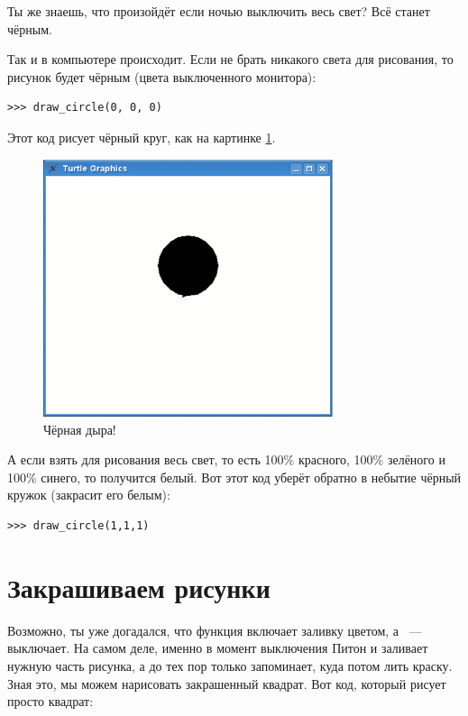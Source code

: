 Ты же знаешь, что произойдёт если ночью выключить весь свет? Всё станет чёрным.

Так и в компьютере происходит. Если не брать никакого света для рисования, то рисунок будет чёрным (цвета выключенного монитора):

\begin{listing}
\begin{verbatim}
>>> draw_circle(0, 0, 0)
\end{verbatim}
\end{listing}

Этот код рисует чёрный круг, как на картинке \ref{fig25}.

\begin{figure}
\begin{center}
\includegraphics[width=85mm]{../en/figure25.eps}
\end{center}
\caption{Чёрная дыра!}\label{fig25}
\end{figure}

А если взять для рисования весь свет, то есть 100\% красного, 100\% зелёного и 100\% синего, то получится белый. Вот этот код уберёт обратно в небытие чёрный кружок (закрасит его белым):

\begin{listing}
\begin{verbatim}
>>> draw_circle(1,1,1)
\end{verbatim}
\end{listing}

\section{Закрашиваем рисунки}

Возможно, ты уже догадался, что функция  включает заливку цветом, а  — выключает. На самом деле, именно в момент выключения Питон и заливает нужную часть рисунка, а до тех пор только запоминает, куда потом лить краску. Зная это, мы можем нарисовать закрашенный квадрат. Вот код, который рисует просто квадрат:

